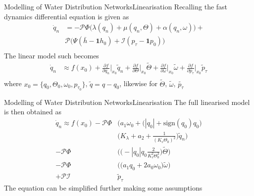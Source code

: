 \begin{frame}{Modelling of Water Distribution Networks}{Linearisation}
	Recalling the fast dynamics differential equation is given as
	\begin{equation}\label{eq:NonLinearModelSimplified}
		\begin{split}
			\dot{q}_n &=  -\mathcal{P}\Phi\Big(\lambda(q_n)+\mu(q_n,\Theta)+\alpha(q_n,\omega)\Big) +\\ &\mathcal{P}\Big(\Psi(\bar{h}-\mathbf{1}h_0) + \mathcal{I}(p_{\tau}-\mathbf{1}p_0)\Big) \\
		\end{split}	
	\end{equation}
	The linear model such becomes
	\begin{equation}\label{eq:SymbolicLinearisation}
		\begin{split}
			\dot{q}_n &\approx f(x_0) + \frac{\partial f}{\partial q_n}\bigg\rvert_{x_0} \tilde{q}_n + \frac{\partial f}{\partial \Theta}\bigg\rvert_{x_0} \tilde{\Theta} + \frac{\partial f}{\partial \omega}\bigg\rvert_{x_0} \tilde{\omega} +  \frac{\partial f}{\partial p_\tau}\bigg\rvert_{x_0} \tilde{p}_\tau
			\\
		\end{split}
	\end{equation}
	where $x_0 = \{q_0,\Theta_0,\omega_0, p_{\tau_0} \}$, $ \tilde{q} =q-q_0$, likewise for $ \tilde{\Theta} $, $ \tilde{\omega}$, $\tilde{p_{\tau}}  $
\end{frame}

\begin{frame}{Modelling of Water Distribution Networks}{Linearisation}
	The full linearised model is then obtained as
	\begin{equation}\label{eq:SymbolicLinearisationExpanded}
		\begin{split}
			\dot{q}_n \approx f(x_0) -\mathcal{P}\Phi & \Bigg(a_1\omega_0 + \Big(|q_0|+\text{sign}(q_0)q_0\Big)\\
			& \Bigg(K_\lambda + a_2 + \frac{1}{(K_v \Theta_0)^2}\Bigg) \tilde{q}_n \Bigg)  \\
			- \mathcal{P}\Phi&\Bigg(\Big(-|q_0|q_0 \frac{2}{K_v^2 \Theta_0^3}\Big) \tilde{\Theta}\Bigg) \\
			- \mathcal{P}\Phi&\Bigg(\Big(a_1 q_0 + 2a_0\omega_0\Big) \tilde{\omega}\Bigg) \\
			+ \mathcal{P} \mathcal{I}& \tilde{p}_\tau
		\end{split}
	\end{equation}
The equation can be simplified further making some assumptions
\end{frame}

